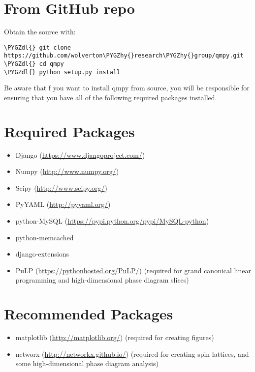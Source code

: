 \documentclass[letterpaper,10pt,english]{sphinxmanual}
\def\PYGZdl{\char`\$}
\def\PYGZhy{\char`\-}
\begin{document}
\section{From GitHub repo}
\label{getting_started:from-github-repo}
Obtain the source with:

\begin{Verbatim}[commandchars=\\\{\}]
\PYGZdl{} git clone https://github.com/wolverton\PYGZhy{}research\PYGZhy{}group/qmpy.git
\PYGZdl{} cd qmpy
\PYGZdl{} python setup.py install
\end{Verbatim}

Be aware that f you want to install qmpy from source, you will be responsible
for ensuring that you have all of the following required packages installed.


\section{Required Packages}
\label{getting_started:required-packages}\begin{itemize}
\item {} 
Django (\href{https://www.djangoproject.com/}{https://www.djangoproject.com/})

\item {} 
Numpy (\href{http://www.numpy.org/}{http://www.numpy.org/})

\item {} 
Scipy (\href{http://www.scipy.org/}{http://www.scipy.org/})

\item {} 
PyYAML (\href{http://pyyaml.org/}{http://pyyaml.org/})

\item {} 
python-MySQL (\href{https://pypi.python.org/pypi/MySQL-python}{https://pypi.python.org/pypi/MySQL-python})

\item {} 
python-memcached

\item {} 
django-extensions

\item {} 
PuLP (\href{https://pythonhosted.org/PuLP/}{https://pythonhosted.org/PuLP/}) (required for grand canonical linear
programming and high-dimensional phase diagram slices)

\end{itemize}


\section{Recommended Packages}
\label{getting_started:recommended-packages}\begin{itemize}
\item {} 
matplotlib (\href{http://matplotlib.org/}{http://matplotlib.org/}) (required for creating figures)

\item {} 
networx (\href{http://networkx.github.io/}{http://networkx.github.io/}) (required for creating spin lattices,
and some high-dimensional phase diagram analysis)

\end{itemize}
\end{document}
